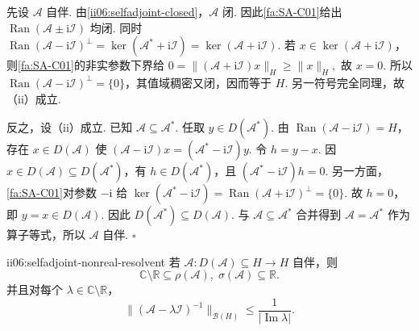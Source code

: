 \begin{FAProof}
先设 \(\displaystyle\mathcal A\) 自伴. 由\autoref{ii06:selfadjoint-closed}，\(\displaystyle\mathcal A\) 闭. 因此\autoref{fa:SA-C01}给出 \(\displaystyle\operatorname{Ran}(\mathcal A\pm\mathrm{i}\mathcal I)\) 均闭. 同时
\(\displaystyle \operatorname{Ran}(\mathcal A-\mathrm{i}\mathcal I)^\perp = \ker(\mathcal A^*+\mathrm{i}\mathcal I) = \ker(\mathcal A+\mathrm{i}\mathcal I).\)
若 \(\displaystyle x\in\ker(\mathcal A+\mathrm{i}\mathcal I)\)，则\autoref{fa:SA-C01}的非实参数下界给
\(\displaystyle 0 = \|(\mathcal A+\mathrm{i}\mathcal I)x\|_H \geqslant \|x\|_H,\)
故 \(\displaystyle x=0\). 所以 \(\displaystyle\operatorname{Ran}(\mathcal A-\mathrm{i}\mathcal I)^\perp=\{0\}\)，其值域稠密又闭，因而等于 \(\displaystyle H\). 另一符号完全同理，故（ii）成立.

反之，设（ii）成立. 已知 \(\displaystyle\mathcal A\subseteq\mathcal A^*\). 任取 \(\displaystyle y\in D(\mathcal A^*)\). 由 \(\displaystyle\operatorname{Ran}(\mathcal A-\mathrm{i}\mathcal I)=H\)，存在 \(\displaystyle x\in D(\mathcal A)\) 使
\(\displaystyle (\mathcal A-\mathrm{i}\mathcal I)x = (\mathcal A^*-\mathrm{i}\mathcal I)y.\)
令 \(\displaystyle h=y-x\). 因 \(\displaystyle x\in D(\mathcal A)\subseteq D(\mathcal A^*)\)，有 \(\displaystyle h\in D(\mathcal A^*)\)，且
\(\displaystyle (\mathcal A^*-\mathrm{i}\mathcal I)h=0.\)
另一方面，\autoref{fa:SA-C01}对参数 \(\displaystyle-\mathrm{i}\) 给
\(\displaystyle \ker(\mathcal A^*-\mathrm{i}\mathcal I) = \operatorname{Ran}(\mathcal A+\mathrm{i}\mathcal I)^\perp = \{0\}.\)
故 \(\displaystyle h=0\)，即 \(\displaystyle y=x\in D(\mathcal A)\). 因此 \(\displaystyle D(\mathcal A^*)\subseteq D(\mathcal A)\). 与 \(\displaystyle\mathcal A\subseteq\mathcal A^*\) 合并得到 \(\displaystyle\mathcal A=\mathcal A^*\) 作为算子等式，所以 \(\displaystyle\mathcal A\) 自伴.
\hfill\(\square\)
\end{FAProof}

\begin{FACorollary}[A][自伴算子的非实预解与实谱]{ii06:selfadjoint-nonreal-resolvent}
若 \(\displaystyle\mathcal A:D(\mathcal A)\subseteq H\to H\) 自伴，则
\[
\mathbb C\setminus\mathbb R\subseteq\rho(\mathcal A),
\;
\sigma(\mathcal A)\subseteq\mathbb R.
\]
并且对每个 \(\displaystyle\lambda\in\mathbb C\setminus\mathbb R\)，
\[
\|(\mathcal A-\lambda\mathcal I)^{-1}\|_{\mathcal B(H)}
\leqslant
\frac{1}{|\operatorname{Im}\lambda|}.
\]
\end{FACorollary}

